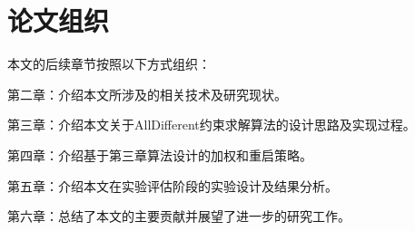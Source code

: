 \section{论文组织}

本文的后续章节按照以下方式组织：

第二章：介绍本文所涉及的相关技术及研究现状。

第三章：介绍本文关于AllDifferent约束求解算法的设计思路及实现过程。

第四章：介绍基于第三章算法设计的加权和重启策略。

第五章：介绍本文在实验评估阶段的实验设计及结果分析。

第六章：总结了本文的主要贡献并展望了进一步的研究工作。